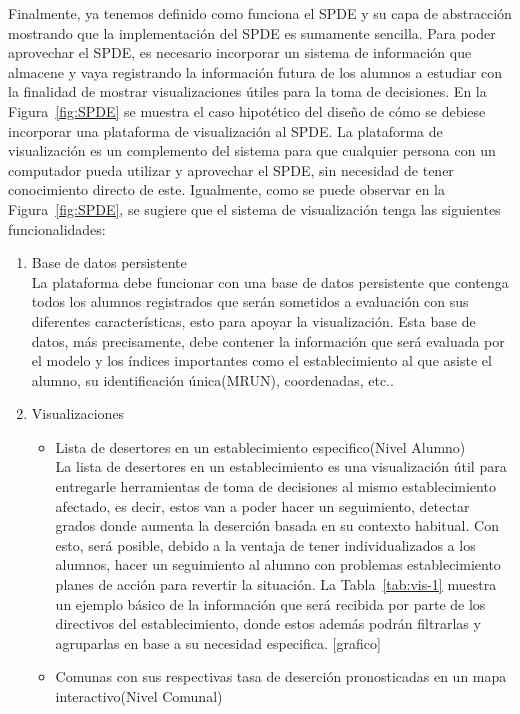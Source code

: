 Finalmente, ya tenemos definido como funciona el SPDE y su capa de abstracción mostrando que la implementación del SPDE es sumamente sencilla. Para poder aprovechar el SPDE, es necesario incorporar un sistema de información que almacene y vaya registrando la información futura de los alumnos a estudiar con la finalidad de mostrar visualizaciones útiles para la toma de decisiones. En la Figura~\ref{fig:SPDE} se muestra el caso hipotético del diseño de cómo se debiese incorporar una plataforma de visualización al SPDE. La plataforma de visualización es un complemento del sistema para que cualquier persona con un computador pueda utilizar y aprovechar el SPDE, sin necesidad de tener conocimiento directo de este. Igualmente, como se puede observar en la Figura~\ref{fig:SPDE}, se sugiere que el sistema de visualización tenga las siguientes funcionalidades:
\begin{enumerate}
\item Base de datos persistente \\ \hfill
La plataforma debe funcionar con una base de datos persistente que contenga todos los alumnos registrados que serán sometidos a evaluación con sus diferentes características, esto para apoyar la visualización. Esta base de datos, más precisamente, debe contener la información que será evaluada por el modelo y los índices importantes como el establecimiento al que asiste el alumno, su identificación única(MRUN), coordenadas, etc..
\item Visualizaciones
    \begin{itemize}
    \item Lista de desertores en un establecimiento especifico(Nivel Alumno) \\ \hfill
    La lista de desertores en un establecimiento es una visualización útil para entregarle herramientas de toma de decisiones al mismo establecimiento afectado, es decir, estos van a poder hacer un seguimiento, detectar grados donde aumenta la deserción basada en su contexto habitual. Con esto, será posible, debido a la ventaja de tener individualizados a los alumnos, hacer un seguimiento al alumno con problemas establecimiento planes de acción para revertir la situación. La Tabla~\ref{tab:vis-1} muestra un ejemplo básico de la información que será recibida por parte de los directivos del establecimiento, donde estos además podrán filtrarlas y agruparlas en base a su necesidad especifica.
    [grafico]
    \item Comunas con sus respectivas tasa de deserción pronosticadas en un mapa interactivo(Nivel Comunal) \\ \hfill

\end{itemize}
\end{enumerate}
